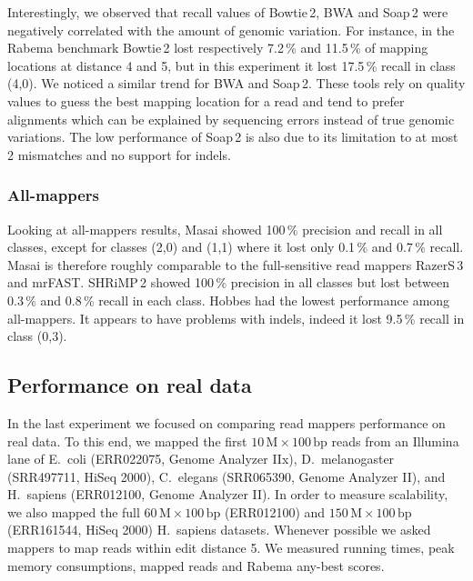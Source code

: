 Interestingly, we observed that recall values of Bowtie\,2, BWA and Soap\,2 were negatively correlated with the amount of genomic variation.
For instance, in the Rabema benchmark Bowtie\,2 lost respectively 7.2\,\% and 11.5\,\% of mapping locations at distance 4 and 5, but in this experiment it lost 17.5\,\% recall in class (4,0).
We noticed a similar trend for BWA and Soap\,2.
These tools rely on quality values to guess the best mapping location for a read and tend to prefer alignments which can be explained by sequencing errors instead of true genomic variations.
The low performance of Soap\,2 is also due to its limitation to at most 2 mismatches and no support for indels.

\subsubsection{All-mappers}
Looking at all-mappers results, Masai showed 100\,\% precision and recall in all classes, except for classes (2,0) and (1,1) where it lost only 0.1\,\% and 0.7\,\% recall.
Masai is therefore roughly comparable to the full-sensitive read mappers RazerS\,3 and mrFAST.
SHRiMP\,2 showed 100\,\% precision in all classes but lost between 0.3\,\% and 0.8\,\% recall in each class.
Hobbes had the lowest performance among all-mappers.
It appears to have problems with indels, indeed it lost 9.5\,\% recall in class (0,3).

\begin{table*}[tH!]
  \caption[Variant detection results]
  {
  \label{tab:Variant}
    {\bfseries Variant detection results.} We show the percentages of found origins (recall) and fraction of unique reads mapped to their origin (precision) classed by reads with $s$ SNPs and $i$ indels $(s,i)$.
  }
  \vspace{-3mm}
  \center
  \sffamily
  \resizebox{0.8\textwidth}{!}
  {
	\renewcommand{\tabcolsep}{0.8ex}
	
  }
\end{table*}

\subsection{Performance on real data}

In the last experiment we focused on comparing read mappers performance on real data.
To this end, we mapped the first $10\,\text{M}\times 100\,\text{bp}$ reads from an Illumina lane of E.~coli (ERR022075, Genome Analyzer IIx), D.~melanogaster (SRR497711, HiSeq 2000), C.~elegans (SRR065390, Genome Analyzer II), and H.~sapiens (ERR012100, Genome Analyzer II).
In order to measure scalability, we also mapped the full $60\,\text{M}\times 100\,\text{bp}$ (ERR012100) and $150\,\text{M}\times 100\,\text{bp}$ (ERR161544, HiSeq 2000) H.~sapiens datasets.
Whenever possible we asked mappers to map reads within edit distance 5.
We measured running times, peak memory consumptions, mapped reads and Rabema any-best scores.

